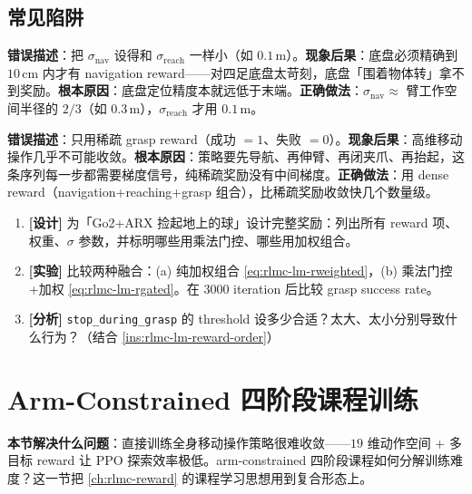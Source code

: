 \subsection{常见陷阱}
\label{sec:rlmc-lm-reward-pitfalls}

\begin{pitfall}
\textbf{错误描述}：把 $\sigma_{\text{nav}}$ 设得和 $\sigma_{\text{reach}}$ 一样小（如 $0.1\,$m）。\textbf{现象后果}：底盘必须精确到 $10\,$cm 内才有 navigation reward——对四足底盘太苛刻，底盘「围着物体转」拿不到奖励。\textbf{根本原因}：底盘定位精度本就远低于末端。\textbf{正确做法}：$\sigma_{\text{nav}}\approx$ 臂工作空间半径的 $2/3$（如 $0.3\,$m），$\sigma_{\text{reach}}$ 才用 $0.1\,$m。
\end{pitfall}

\begin{pitfall}
\textbf{错误描述}：只用稀疏 grasp reward（成功 $=1$、失败 $=0$）。\textbf{现象后果}：高维移动操作几乎不可能收敛。\textbf{根本原因}：策略要先导航、再伸臂、再闭夹爪、再抬起，这条序列每一步都需要梯度信号，纯稀疏奖励没有中间梯度。\textbf{正确做法}：用 dense reward（navigation+reaching+grasp 组合），比稀疏奖励收敛快几个数量级。
\end{pitfall}

\begin{practice}[练习·多目标奖励]
\begin{enumerate}
\item \textbf{[设计]} 为「Go2+ARX 捡起地上的球」设计完整奖励：列出所有 reward 项、权重、$\sigma$ 参数，并标明哪些用乘法门控、哪些用加权组合。
\item \textbf{[实验]} 比较两种融合：(a) 纯加权组合 \cref{eq:rlmc-lm-rweighted}，(b) 乘法门控+加权 \cref{eq:rlmc-lm-rgated}。在 $3000$ iteration 后比较 grasp success rate。
\item \textbf{[分析]} \verb|stop_during_grasp| 的 threshold 设多少合适？太大、太小分别导致什么行为？（结合 \cref{ins:rlmc-lm-reward-order}）
\end{enumerate}
\end{practice}

\section{Arm-Constrained 四阶段课程训练}
\label{sec:rlmc-lm-curriculum}

\textbf{本节解决什么问题}：直接训练全身移动操作策略很难收敛——$19$ 维动作空间 + 多目标 reward 让 PPO 探索效率极低。arm-constrained 四阶段课程如何分解训练难度？这一节把 \cref{ch:rlmc-reward} 的课程学习思想用到复合形态上。


